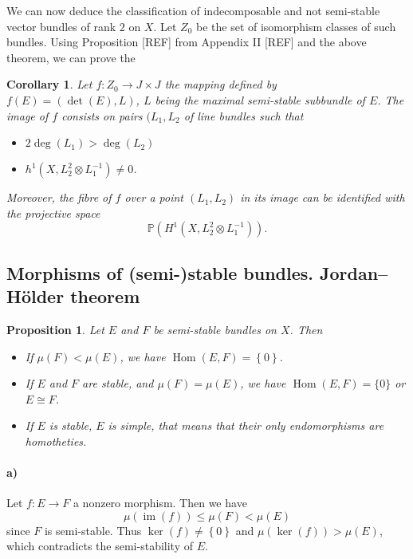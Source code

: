 \documentclass[12pt,a4paper]{book}
\DeclareMathOperator\Hom{Hom}
\DeclareMathOperator\im{im}
\newtheorem{prop}[thm]{Proposition}
\newtheorem{corol}[thm]{Corollary}
\theoremstyle{definition} \newtheorem{defn}[thm]{Definition}
\theoremstyle{definition} \newtheorem{ejs}[thm]{Examples}
\theoremstyle{definition} \newtheorem{ej}[thm]{Example}
\begin{document}
      We can now deduce the classification of indecomposable and not semi-stable vector bundles of rank $2$ on $X$. Let $Z_0$ be the set of isomorphism classes of such bundles. Using Proposition [REF] from Appendix II [REF] and the above theorem, we can prove the
      \begin{corol} \label{1.5}
	Let $f:Z_0 \rightarrow J\times J$ the mapping defined by $f(E)=(\det(E),L)$, $L$ being the maximal semi-stable subbundle of $E$. The image of $f$ consists on pairs $(L_1,L_2$ of line bundles such that
	\begin{itemize}
	  \item[(i)] $2\deg(L_1) > \deg(L_2)$
	  \item[(ii)] $h^1(X,L_2^2 \otimes L_1^{-1}) \neq 0$. 
	\end{itemize}

	Moreover, the fibre of $f$ over a point $(L_1,L_2)$ in its image can be identified with the projective space
	\begin{equation*}
	  \mathbb{P}(H^1(X,L_2^2\otimes L_1^{-1})).
	\end{equation*}
      \end{corol}

      \subsection{Morphisms of (semi-)stable bundles. Jordan--Hölder theorem}
      \begin{prop}\label{1.6}
	Let $E$ and $F$ be semi-stable bundles on $X$. Then
	\begin{itemize}
	  \item[\rm a)] If $\mu(F)<\mu(E)$, we have $\Hom(E,F)=\left\{ 0 \right\}$.
	  \item[\rm b)] If $E$ and $F$ are stable, and $\mu(F)=\mu(E)$, we have $\Hom(E,F)=\{0\}$ or $E\cong F$.
	  \item[\rm c)] If $E$ is stable, $E$ is simple, that means that their only endomorphisms are homotheties.
	\end{itemize}
      \end{prop}
      
      \paragraph{\rm a)} Let $f: E \rightarrow F$ a nonzero morphism. Then we have
      \begin{equation*}
	\mu(\im(f)) \leq \mu(F) < \mu(E)
      \end{equation*}
      since $F$ is semi-stable. Thus $\ker(f) \neq \left\{ 0 \right\}$ and $\mu(\ker(f)) > \mu(E)$, which contradicts the semi-stability of $E$.
\end{document}
